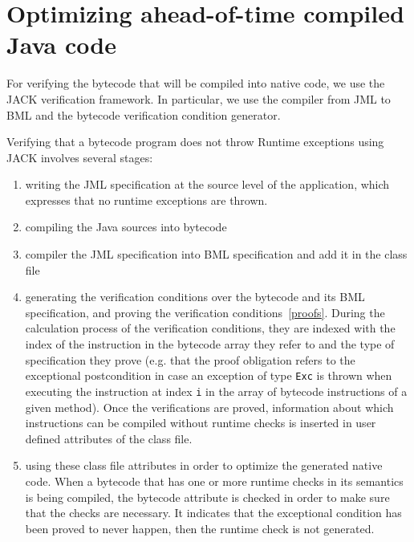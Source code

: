 \section{Optimizing ahead-of-time compiled Java code}
\label{sec:method}

For verifying the bytecode that will be compiled into native code, we use the JACK verification framework.
In particular, we use the compiler from JML to BML and the bytecode verification condition generator.



Verifying that a bytecode program does not throw Runtime exceptions using JACK involves several stages:
\begin{enumerate}
\item writing the JML specification at the source level of the application, which expresses that no runtime exceptions are thrown.
\item compiling the Java sources into bytecode 
\item compiler the JML specification into BML specification and add it in the class file
\item generating the verification conditions over the bytecode and its BML specification, and proving the verification conditions~\ref{proofs}. During the calculation process of the verification conditions, they are indexed with the index of the instruction in the bytecode array they refer to and the type of specification they prove (e.g. that the proof obligation refers to the exceptional postcondition in case an exception of type \texttt{Exc} is thrown when executing the instruction at index \texttt{i} in the array of bytecode instructions of a given method). Once the verifications are proved, information about which instructions can be compiled without runtime checks is inserted in user defined attributes of the class file.
\item using these class file attributes in order to optimize the generated native code. When a bytecode that has one or more runtime checks in its semantics is being compiled, the bytecode attribute is checked in order to make sure that the checks are necessary. It indicates that the exceptional condition has been proved to never happen, then the runtime check is not generated.
\end{enumerate}

